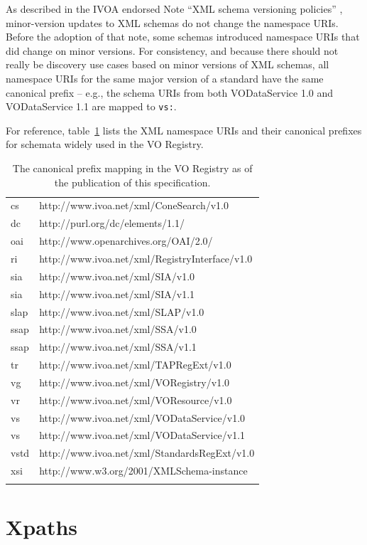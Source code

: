 \documentclass[11pt,a4paper]{ivoa}
\begin{document}
As described in the IVOA endorsed Note ``XML schema versioning
policies'' \citep{2018ivoa.spec.0529H}, minor-version updates to XML
schemas do not change the namespace URIs.  Before the adoption of that
note, some schemas introduced namespace URIs that did change on minor
versions.  For consistency, and because there should not really be
discovery use cases based on minor versions of XML schemas, all
namespace URIs for the same major version of a standard have the same
canonical prefix -- e.g., the schema URIs from both VODataService
1.0 and VODataService 1.1 are mapped to \texttt{vs:}.

For reference, table~\ref{tab:prefixmap}
lists the XML namespace URIs and their canonical prefixes
for schemata widely used in the VO Registry.

\begin{table}
\begin{tabular}{ll}
\sptablerule
cs&http://www.ivoa.net/xml/ConeSearch/v1.0\\
dc&http://purl.org/dc/elements/1.1/\\
oai&http://www.openarchives.org/OAI/2.0/\\
ri&http://www.ivoa.net/xml/RegistryInterface/v1.0\\
sia&http://www.ivoa.net/xml/SIA/v1.0\\
sia&http://www.ivoa.net/xml/SIA/v1.1\\
slap&http://www.ivoa.net/xml/SLAP/v1.0\\
ssap&http://www.ivoa.net/xml/SSA/v1.0\\
ssap&http://www.ivoa.net/xml/SSA/v1.1\\
tr&http://www.ivoa.net/xml/TAPRegExt/v1.0\\
vg&http://www.ivoa.net/xml/VORegistry/v1.0\\
vr&http://www.ivoa.net/xml/VOResource/v1.0\\
vs&http://www.ivoa.net/xml/VODataService/v1.0\\
vs&http://www.ivoa.net/xml/VODataService/v1.1\\
vstd&http://www.ivoa.net/xml/StandardsRegExt/v1.0\\
xsi&http://www.w3.org/2001/XMLSchema-instance\\
\sptablerule
\end{tabular}
\caption{The canonical prefix mapping in the VO Registry as of the
publication of this specification.}
\label{tab:prefixmap}
\end{table}


\section{Xpaths}
\end{document}
